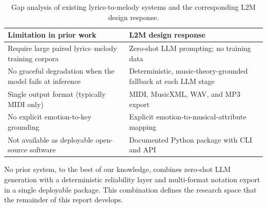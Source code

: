 \begin{table}[ht]
\centering
\caption[Gap analysis of existing lyrics-to-melody systems]{Gap analysis of
existing lyrics-to-melody systems and the corresponding L2M design response.}
\label{tab:gap-analysis}
\begin{tabular}{p{6.3cm} p{5.8cm}}
\toprule
\textbf{Limitation in prior work} & \textbf{L2M design response} \\
\midrule
Require large paired lyrics--melody training corpora & Zero-shot LLM
prompting; no training data \\
No graceful degradation when the model fails at inference & Deterministic,
music-theory-grounded fallback at each LLM stage \\
Single output format (typically MIDI only) & MIDI, MusicXML, WAV, and MP3
export \\
No explicit emotion-to-key grounding & Explicit emotion-to-musical-attribute
mapping \\
Not available as deployable open-source software & Documented Python package
with CLI and API \\
\bottomrule
\end{tabular}
\end{table}

No prior system, to the best of our knowledge, combines zero-shot LLM
generation with a deterministic reliability layer and multi-format notation
export in a single deployable package. This combination defines the research
space that the remainder of this report develops.
